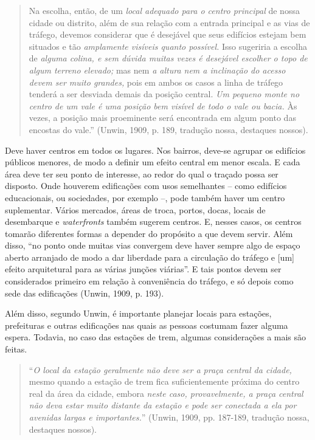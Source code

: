 \documentclass[12pt, a4paper]{book} %
\begin{document}
        \begin{quotation}
            Na escolha, então, de um \textit{local adequado para o centro principal} de nossa cidade ou distrito, além de sua relação com a entrada principal e as vias de tráfego, devemos considerar que é desejável que seus edifícios estejam bem situados e tão \textit{amplamente visíveis quanto possível.} Isso sugeriria a escolha de \textit{alguma colina, e sem dúvida muitas vezes é desejável escolher o topo de algum terreno elevado;} mas nem \textit{a altura nem a inclinação do acesso devem ser muito grandes,} pois em ambos os casos a linha de tráfego tenderá a ser desviada demais da posição central. \textit{Um pequeno monte no centro de um vale é uma posição bem visível de todo o vale ou bacia.} Às vezes, a posição mais proeminente será encontrada em algum ponto das encostas do vale.'' (Unwin, 1909, p. 189, tradução nossa, destaques nossos).
        \end{quotation}

        Deve haver centros em todos os lugares. Nos bairros, deve-se agrupar os edifícios públicos menores, de modo a definir um efeito central em menor escala. E cada área deve ter seu ponto de interesse, ao redor do qual o traçado possa ser disposto. Onde houverem edificações com usos semelhantes – como edifícios educacionais, ou sociedades, por exemplo –, pode também haver um centro suplementar. Vários mercados, áreas de troca, portos, docas, locais de desembarque e \textit{waterfronts} também sugerem centros. E, nesses casos, os centros tomarão diferentes formas a depender do propósito a que devem servir. Além disso, ``no ponto onde muitas vias convergem deve haver sempre algo de espaço aberto arranjado de modo a dar liberdade para a circulação do tráfego e [um] efeito arquitetural para as várias junções viárias''. E tais pontos devem ser considerados primeiro em relação à conveniência do tráfego, e só depois como sede das edificações (Unwin, 1909, p. 193).

        Além disso, segundo Unwin, é importante planejar locais para estações, prefeituras e outras edificações nas quais as pessoas costumam fazer alguma espera. Todavia, no caso das estações de trem, algumas considerações a mais são feitas. 

        \begin{quotation}
            ``\textit{O local da estação geralmente não deve ser a praça central da cidade,} mesmo quando a estação de trem fica suficientemente próxima do centro real da área da cidade, embora \textit{neste caso, provavelmente, a praça central não deva estar muito distante da estação e pode ser conectada a ela por avenidas largas e importantes.}'' (Unwin, 1909, pp. 187-189, tradução nossa, destaques nossos).
        \end{quotation}
\end{document}
